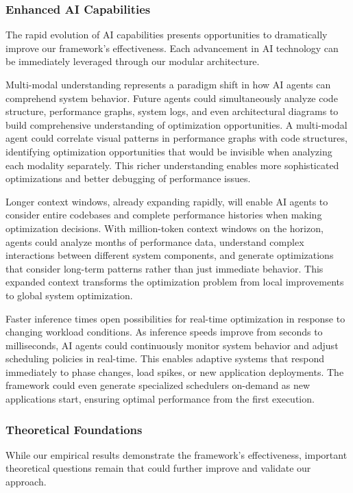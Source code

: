 \subsubsection{Enhanced AI Capabilities}
The rapid evolution of AI capabilities presents opportunities to dramatically improve our framework's effectiveness. Each advancement in AI technology can be immediately leveraged through our modular architecture.

Multi-modal understanding represents a paradigm shift in how AI agents can comprehend system behavior. Future agents could simultaneously analyze code structure, performance graphs, system logs, and even architectural diagrams to build comprehensive understanding of optimization opportunities. A multi-modal agent could correlate visual patterns in performance graphs with code structures, identifying optimization opportunities that would be invisible when analyzing each modality separately. This richer understanding enables more sophisticated optimizations and better debugging of performance issues.

Longer context windows, already expanding rapidly, will enable AI agents to consider entire codebases and complete performance histories when making optimization decisions. With million-token context windows on the horizon, agents could analyze months of performance data, understand complex interactions between different system components, and generate optimizations that consider long-term patterns rather than just immediate behavior. This expanded context transforms the optimization problem from local improvements to global system optimization.

Faster inference times open possibilities for real-time optimization in response to changing workload conditions. As inference speeds improve from seconds to milliseconds, AI agents could continuously monitor system behavior and adjust scheduling policies in real-time. This enables adaptive systems that respond immediately to phase changes, load spikes, or new application deployments. The framework could even generate specialized schedulers on-demand as new applications start, ensuring optimal performance from the first execution.

\subsubsection{Theoretical Foundations}
While our empirical results demonstrate the framework's effectiveness, important theoretical questions remain that could further improve and validate our approach.

